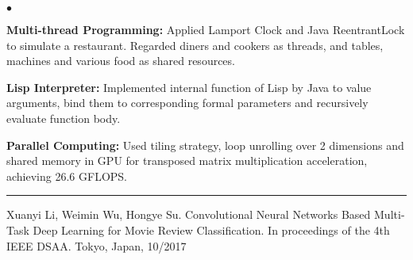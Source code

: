 \documentclass[letterpaper,11pt]{article}
\newcommand{\listparam}{
    \setlength{\parsep}{\parskip}
    \setlength{\itemsep}{0ex}
    \setlength{\labelwidth}{2em}
    \setlength{\labelsep}{1em}
    \setlength{\topsep}{0pt}
    \setlength{\partopsep}{0ex}
    \setlength{\leftmargin}{2em}
}
\renewcommand{\section}[1]{\vspace{4pt}{\large\textbf{#1}}\vspace{1pt}\hrule\vspace{2pt}}
\begin{document}
{\small
\begin{list}{$\bullet$}{\listparam}
\item \textbf{Multi-thread Programming:} Applied Lamport Clock and Java ReentrantLock to simulate a restaurant. Regarded diners and cookers as threads, and tables, machines and various food as shared resources.
\item \textbf{Lisp Interpreter:} Implemented internal function of Lisp by Java to value arguments, bind them to corresponding formal parameters and recursively evaluate function body.
\item \textbf{Parallel Computing:} Used tiling strategy, loop unrolling over 2 dimensions and shared memory in GPU for transposed matrix multiplication acceleration, achieving 26.6 GFLOPS.
\end{list}
}

\section{PUBLICATION}

{\small
Xuanyi Li, Weimin Wu, Hongye Su. Convolutional Neural Networks Based Multi-Task Deep Learning for
Movie Review Classification. In proceedings of the 4th IEEE DSAA. Tokyo, Japan, 10/2017
}
\end{document}
